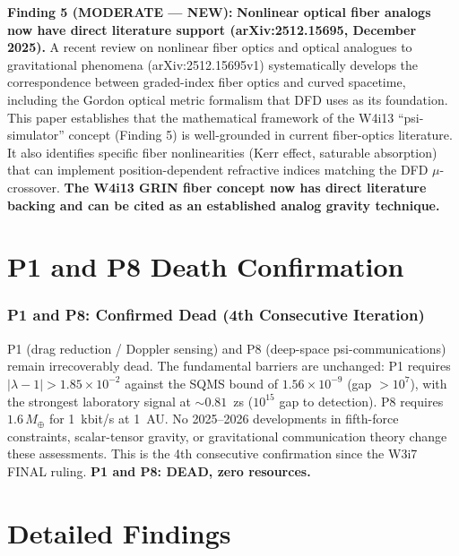 \documentclass[11pt]{article}
\newcommand{\ee}[1]{\times 10^{#1}}
\newcommand{\lamdiff}{|\lambda{-}1|}
\begin{document}
\begin{tcolorbox}[colback=red!5!white, colframe=red!60!black,
  title=\textbf{TOP 5 FINDINGS --- W4i14}]
\textbf{Finding 5 (MODERATE --- NEW):}
\textbf{Nonlinear optical fiber analogs now have direct literature
support (arXiv:2512.15695, December 2025).}  A recent review on
nonlinear fiber optics and optical analogues to gravitational phenomena
(arXiv:2512.15695v1) systematically develops the correspondence between
graded-index fiber optics and curved spacetime, including the Gordon
optical metric formalism that DFD uses as its foundation.  This paper
establishes that the mathematical framework of the W4i13 ``psi-simulator''
concept (Finding 5) is well-grounded in current fiber-optics literature.
It also identifies specific fiber nonlinearities (Kerr effect, saturable
absorption) that can implement position-dependent refractive indices
matching the DFD $\mu$-crossover.  \textbf{The W4i13 GRIN fiber concept
now has direct literature backing and can be cited as an established
analog gravity technique.}

\end{tcolorbox}


\part{P1 and P8 Death Confirmation}

\section{P1 and P8: Confirmed Dead (4th Consecutive Iteration)}

P1 (drag reduction / Doppler sensing) and P8 (deep-space psi-communications)
remain irrecoverably dead.  The fundamental barriers are unchanged:
P1 requires $\lamdiff > 1.85\ee{-2}$ against the SQMS bound of
$1.56\ee{-9}$ (gap $> 10^7$), with the strongest laboratory signal at
$\sim 0.81$~zs ($10^{15}$ gap to detection).  P8 requires $1.6\,M_\oplus$
for 1~kbit/s at 1~AU.  No 2025--2026 developments in fifth-force
constraints, scalar-tensor gravity, or gravitational communication theory
change these assessments.  This is the 4th consecutive confirmation
since the W3i7 FINAL ruling.  \textbf{P1 and P8: DEAD, zero resources.}


\part{Detailed Findings}
\end{document}
